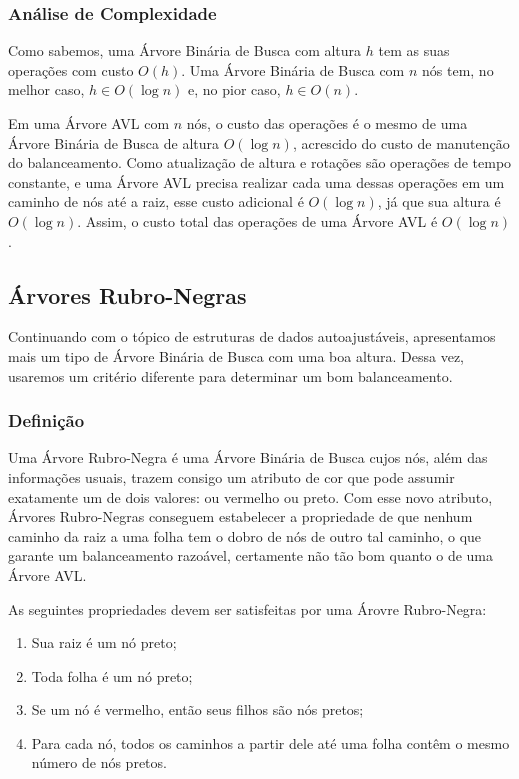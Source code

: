 \documentclass[11pt]{article}
\begin{document}
\subsubsection{Análise de Complexidade}
\label{sec:orgda25ea9}

Como sabemos, uma Árvore Binária de Busca com altura \(h\) tem as
suas operações com custo \(O(h)\).  Uma Árvore Binária de Busca com
\(n\) nós tem, no melhor caso, \(h \in O(\log n)\) e, no pior caso, \(h
    \in O(n)\).

Em uma Árvore AVL com \(n\) nós, o custo das operações é o mesmo de
uma Árvore Binária de Busca de altura \(O(\log n)\), acrescido do
custo de manutenção do balanceamento.  Como atualização de altura
e rotações são operações de tempo constante, e uma Árvore AVL
precisa realizar cada uma dessas operações em um caminho de nós
até a raiz, esse custo adicional é \(O(\log n)\), já que sua altura
é \(O(\log n)\).  Assim, o custo total das operações de uma Árvore
AVL é \(O(\log n)\).

\subsection{Árvores Rubro-Negras}
\label{sec:orgef19a56}

Continuando com o tópico de estruturas de dados autoajustáveis,
apresentamos mais um tipo de Árvore Binária de Busca com uma boa
altura.  Dessa vez, usaremos um critério diferente para determinar
um bom balanceamento.

\subsubsection{Definição}
\label{sec:org3e3eb67}

Uma Árvore Rubro-Negra é uma Árvore Binária de Busca cujos nós,
além das informações usuais, trazem consigo um atributo de cor que
pode assumir exatamente um de dois valores: ou vermelho ou preto.
Com esse novo atributo, Árvores Rubro-Negras conseguem estabelecer
a propriedade de que nenhum caminho da raiz a uma folha tem o
dobro de nós de outro tal caminho, o que garante um balanceamento
razoável, certamente não tão bom quanto o de uma Árvore AVL.

As seguintes propriedades devem ser satisfeitas por uma Árovre
Rubro-Negra:
\begin{enumerate}
\item \label{org01575c0} Sua raiz é um nó preto;
\item Toda folha é um nó preto;
\item \label{org64120cd} Se um nó é vermelho, então seus filhos
são nós pretos;
\item \label{org76cf2e3} Para cada nó, todos os caminhos a
partir dele até uma folha contêm o mesmo número de nós pretos.
\end{enumerate}
\end{document}
